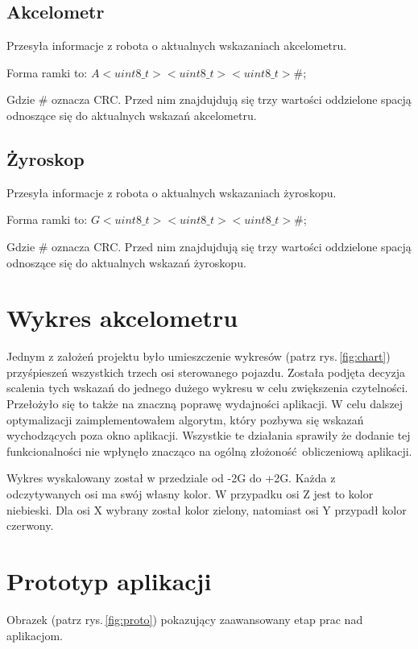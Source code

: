 \documentclass[12pt,a4paper,polish]{article}
\begin{document}
  \subsection{Akcelometr}
  Przesyła informacje z robota o aktualnych wskazaniach akcelometru.

  Forma ramki to: $A<uint8\_t> <uint8\_t> <uint8\_t>\#$;
  \newline

  Gdzie \# oznacza CRC. Przed nim znajdujdują się trzy wartości oddzielone spacją
  odnoszące się do aktualnych wskazań akcelometru.


  \subsection{Żyroskop}
  Przesyła informacje z robota o aktualnych wskazaniach żyroskopu.

  Forma ramki to: $G<uint8\_t> <uint8\_t> <uint8\_t>\#$;
  \newline

  Gdzie \# oznacza CRC. Przed nim znajdujdują się trzy wartości oddzielone spacją
  odnoszące się do aktualnych wskazań żyroskopu.

  \section{Wykres akcelometru}
  Jednym z założeń projektu było umieszczenie wykresów (patrz rys.\,\ref{fig:chart}) przyśpieszeń wszystkich
  trzech osi sterowanego pojazdu. Została podjęta decyzja scalenia tych wskazań
  do jednego dużego wykresu w celu zwiększenia czytelności. Przełożyło się to także
  na znaczną poprawę wydajności aplikacji. W celu dalszej optymalizacji 
  zaimplementowałem algorytm, który pozbywa się wskazań wychodzących poza okno 
  aplikacji. Wszystkie te działania sprawiły że dodanie tej funkcionalności
  nie wpłynęło znacząco na ogólną złożoność obliczeniową aplikacji.
  
  Wykres wyskalowany został w przedziale od -2G do +2G. Każda z odczytywanych osi
  ma swój własny kolor. W przypadku osi Z jest to kolor niebieski. 
  Dla osi X wybrany został kolor zielony, natomiast osi Y przypadł kolor czerwony.

  \section{Prototyp aplikacji}
  Obrazek (patrz rys.\,\ref{fig:proto}) pokazujący zaawansowany etap prac nad aplikacjom.
\end{document}
